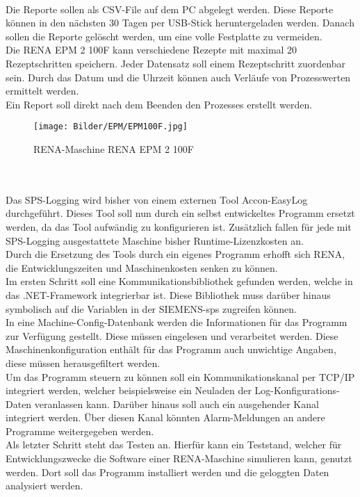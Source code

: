\ \\
Die Reporte sollen als CSV-File auf dem PC abgelegt werden. Diese Reporte können in den nächsten 30 Tagen per USB-Stick \glqq heruntergeladen\grqq{} werden. Danach sollen die Reporte gelöscht werden, um eine volle Festplatte zu vermeiden. 
\ \\
Die \glqq RENA EPM 2 100F\grqq{} kann verschiedene Rezepte mit maximal 20 Rezeptschritten speichern. Jeder Datensatz soll einem Rezeptschritt zuordenbar sein. Durch das Datum und die Uhrzeit können auch Verläufe von Prozesswerten ermittelt werden.
\ \\ 
Ein Report soll direkt nach dem Beenden den Prozesses erstellt werden.

\begin{figure}
\centering
 \texttt{[image: Bilder/EPM/EPM100F.jpg]}
 \caption[RENA-Maschine \glqq RENA EPM 2 100F\grqq{}]{RENA-Maschine \glqq RENA EPM 2 100F\grqq{}}
 \label{fig:EPM100F}
\end{figure}
\ \\
\textbf{}
\ \\
Das SPS-Logging wird bisher von einem externen Tool \glqq Accon-EasyLog\grqq{} durchgeführt. Dieses Tool soll nun durch ein selbst entwickeltes Programm ersetzt werden, da das Tool aufwändig zu konfigurieren ist. Zusätzlich fallen für jede mit SPS-Logging ausgestattete Maschine bisher Runtime-Lizenzkosten an. 
\ \\
Durch die Ersetzung des Tools durch ein eigenes Programm erhofft sich RENA, die Entwicklungszeiten und Maschinenkosten senken zu können.
\ \\
Im ersten Schritt soll eine Kommunikationsbibliothek  gefunden werden, welche in das .NET-Framework integrierbar ist. Diese Bibliothek muss darüber hinaus symbolisch auf die Variablen in der SIEMENS-\ac{sps} zugreifen können.
\ \\
In eine \glqq Machine-Config\grqq{}-Datenbank werden die Informationen für das Programm zur Verfügung gestellt. Diese müssen eingelesen und verarbeitet werden. Diese Maschinenkonfiguration enthält für das Programm auch unwichtige Angaben, diese müssen herausgefiltert werden.
\ \\
Um das Programm steuern zu können soll ein Kommunikationskanal per TCP/IP integriert werden, welcher beispielsweise ein Neuladen der Log-Konfigurations-Daten veranlassen kann. Darüber hinaus soll auch ein ausgehender Kanal integriert werden. Über diesen Kanal könnten Alarm-Meldungen an andere Programme weitergegeben werden.
\ \\
Als letzter Schritt steht das Testen an. Hierfür kann ein Teststand, welcher für Entwicklungszwecke die Software einer RENA-Maschine simulieren kann, genutzt werden. Dort soll das Programm installiert werden und die geloggten Daten analysiert werden.
